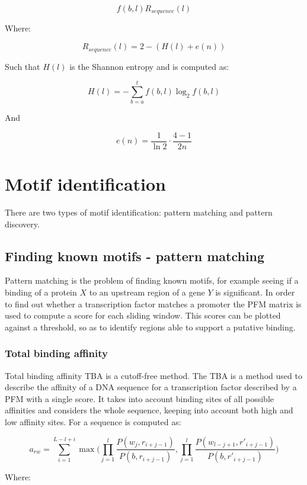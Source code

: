 	$$f(b,l)R_{sequence}(l)$$

	Where:

	$$R_{sequence}(l) = 2-(H(l) + e(n))$$

	Such that $H(l)$ is the Shannon entropy and is computed as:

	$$H(l) = -\sum\limits_{b=a}^tf(b,l)\log_2 f(b,l)$$

	And

	$$e(n) = \frac{1}{\ln 2}\cdot \frac{4-1}{2n}$$

\section{Motif identification}
There are two types of motif identification: pattern matching and pattern discovery.

	\subsection{Finding known motifs - pattern matching}
	Pattern matching is the problem of finding known motifs, for example seeing if a binding of a protein $X$ to an upstream region of a gene $Y$ is significant.
	In order to find out whether a transcription factor matches a promoter the PFM matrix is used to compute a score for each sliding window.
	This scores can be plotted against a threshold, so as to identify regions able to support a putative binding.

		\subsubsection{Total binding affinity}
		Total binding affinity TBA is a cutoff-free method.
		The TBA is a method used to describe the affinity of a DNA sequence for a transcription factor described by a PFM with a single score.
		It takes into account binding sites of all possible affinities and considers the whole sequence, keeping into account both high and low affinity sites.
		For a sequence is computed as:

		$$a_{rw} = \sum\limits_{i=1}^{L-l+i}\max\bigg(\prod\limits_{j=1}^l \frac{P(w_j, r_{i+j-1})}{P(b, r_{i+j-1})}, \prod\limits_{j=1}^l\frac{P(w_{l-j+1}, r'_{i+j-1})}{P(b, r'_{i+j-1})}\bigg)$$

		Where:

